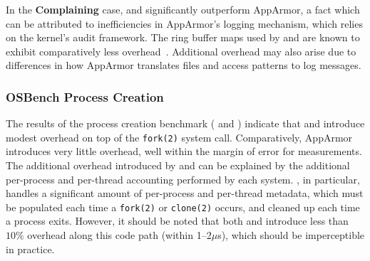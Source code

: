 In the \textbf{Complaining} case, \bpfbox{} and \bpfcontain{} significantly outperform
AppArmor, a fact which can be attributed to inefficiencies in AppArmor's logging
mechanism, which relies on the kernel's audit framework. The ring buffer maps used by
\bpfbox{} and \bpfcontain{} are known to exhibit comparatively less
overhead~\cite{zeng2015_auditing, zhang2021_lsm_file_overhead, nakryiko2020_ringbuf}.
Additional overhead may also arise due to differences in how AppArmor translates files and
access patterns to log messages.

\subsubsection{OSBench Process Creation}

The results of the process creation benchmark ( and ) indicate
that \bpfbox{} and \bpfcontain{} introduce modest overhead on top of the \texttt{fork(2)}
system call.  Comparatively, AppArmor introduces very little overhead, well within the
margin of error for measurements. The additional overhead introduced by \bpfbox{} and
\bpfcontain{} can be explained by the additional per-process and per-thread accounting
performed by each system. \bpfcontain{}, in particular, handles a significant amount of
per-process and per-thread metadata, which must be populated each time a \texttt{fork(2)}
or \texttt{clone(2)} occurs, and cleaned up each time a process exits. However, it should
be noted that both \bpfbox{} and \bpfcontain{} introduce less than $10\%$ overhead along
this code path (within 1--2$\mu$s), which should be imperceptible in practice.



\FloatBarrier

